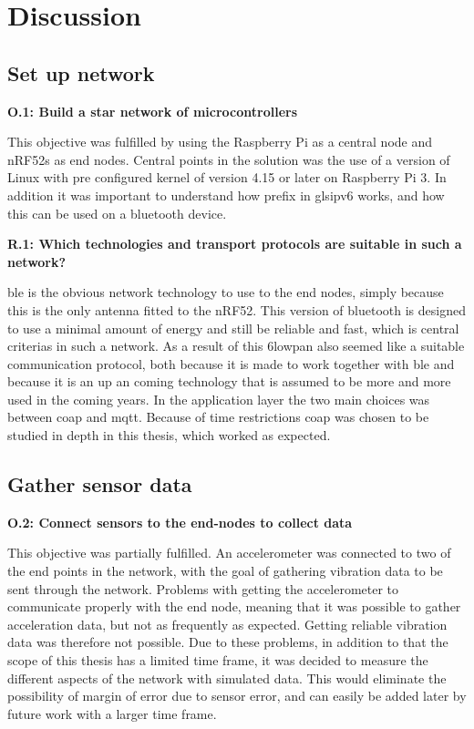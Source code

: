 \chapter{Discussion}
\label{chp:dataAnalysis}


\section{Set up network}

\noindent \textbf{O.1: Build a star network of microcontrollers}

This objective was fulfilled by using the Raspberry Pi as a central node and nRF52s as end nodes. Central points in the solution was the use of a version of Linux with pre configured kernel of version 4.15 or later on Raspberry Pi 3. In addition it was important to understand how prefix in gls{ipv6} works, and how this can be used on a bluetooth device.


\noindent \textbf{R.1: Which technologies and transport protocols are suitable in such a network?}

\gls{ble} is the obvious network technology to use to the end nodes, simply because this is the only antenna fitted to the nRF52. This version of bluetooth is designed to use a minimal amount of energy and still be reliable and fast, which is central criterias in such a network. As a result of this \gls{6lowpan} also seemed like a suitable communication protocol, both because it is made to work together with \gls{ble} and because it is an up an coming technology that is assumed to be more and more used in the coming years. In the application layer the two main choices was between \gls{coap} and \gls{mqtt}. Because of time restrictions \gls{coap} was chosen to be studied in depth in this thesis, which worked as expected. 

\newpage

\section{Gather sensor data}

\noindent\textbf{O.2: Connect sensors to the end-nodes to collect data}

This objective was partially fulfilled. An accelerometer was connected to two of the end points in the network, with the goal of gathering vibration data to be sent through the network. Problems with getting the accelerometer to communicate properly with the end node, meaning that it was possible to gather acceleration data, but not as frequently as expected. Getting reliable vibration data was therefore not possible. Due to these problems, in addition to that the scope of this thesis has a limited time frame, it was decided to measure the different aspects of the network with simulated data. This would eliminate the possibility of margin of error due to sensor error, and can easily be added later by future work with a larger time frame. 

